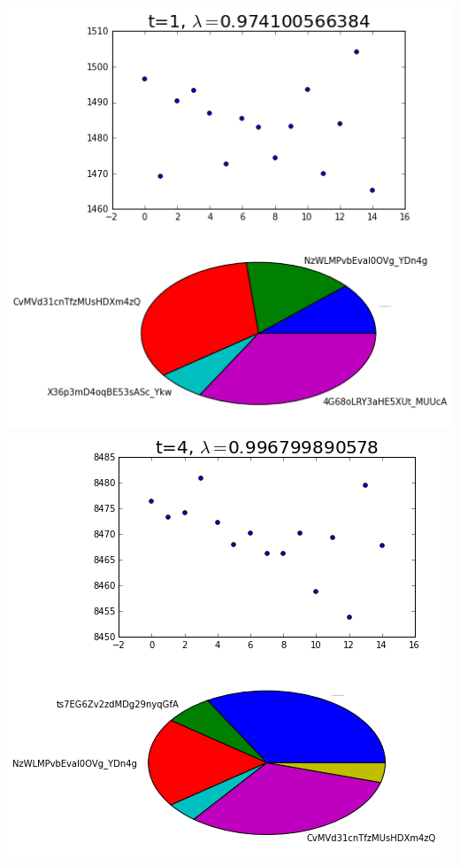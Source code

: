 \documentclass{article}
\begin{document}
	{\centering
		\hspace*{-3.75cm}
		\includegraphics[scale=0.4]{full_1t}
		\hspace*{1cm}
		\includegraphics[scale=0.4]{full_4t}
		\hspace*{-3.75cm}
}
\end{document}
